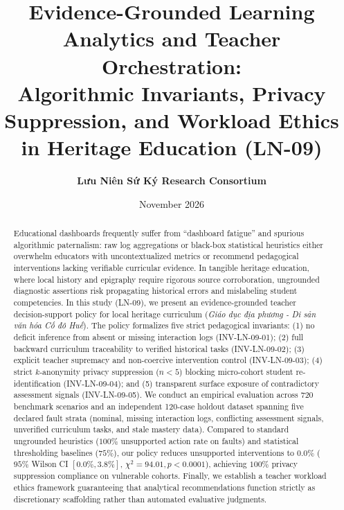 \documentclass[11pt,a4paper]{article}
\title{\textbf{Evidence-Grounded Learning Analytics and Teacher Orchestration:\\
Algorithmic Invariants, Privacy Suppression, and Workload Ethics in Heritage Education (LN-09)}}
\author{\textbf{Lưu Niên Sứ Ký Research Consortium}}
\date{November 2026}
\begin{document}
\maketitle

\begin{abstract}
Educational dashboards frequently suffer from ``dashboard fatigue'' and spurious algorithmic paternalism: raw log aggregations or black-box statistical heuristics either overwhelm educators with uncontextualized metrics or recommend pedagogical interventions lacking verifiable curricular evidence. In tangible heritage education, where local history and epigraphy require rigorous source corroboration, ungrounded diagnostic assertions risk propagating historical errors and mislabeling student competencies.
In this study (LN-09), we present an evidence-grounded teacher decision-support policy for local heritage curriculum (\textit{Giáo dục địa phương - Di sản văn hóa Cố đô Huế}). The policy formalizes five strict pedagogical invariants: (1) no deficit inference from absent or missing interaction logs (\textsc{INV-LN-09-01}); (2) full backward curriculum traceability to verified historical tasks (\textsc{INV-LN-09-02}); (3) explicit teacher supremacy and non-coercive intervention control (\textsc{INV-LN-09-03}); (4) strict $k$-anonymity privacy suppression ($n < 5$) blocking micro-cohort student re-identification (\textsc{INV-LN-09-04}); and (5) transparent surface exposure of contradictory assessment signals (\textsc{INV-LN-09-05}).
We conduct an empirical evaluation across 720 benchmark scenarios and an independent 120-case holdout dataset spanning five declared fault strata (nominal, missing interaction logs, conflicting assessment signals, unverified curriculum tasks, and stale mastery data). Compared to standard ungrounded heuristics ($100\%$ unsupported action rate on faults) and statistical thresholding baselines ($75\%$), our policy reduces unsupported interventions to $0.0\%$ ($95\%$ Wilson CI $[0.0\%, 3.8\%]$, $\chi^2 = 94.01, p < 0.0001$), achieving $100\%$ privacy suppression compliance on vulnerable cohorts. Finally, we establish a teacher workload ethics framework guaranteeing that analytical recommendations function strictly as discretionary scaffolding rather than automated evaluative judgments.
\end{abstract}
\end{document}
